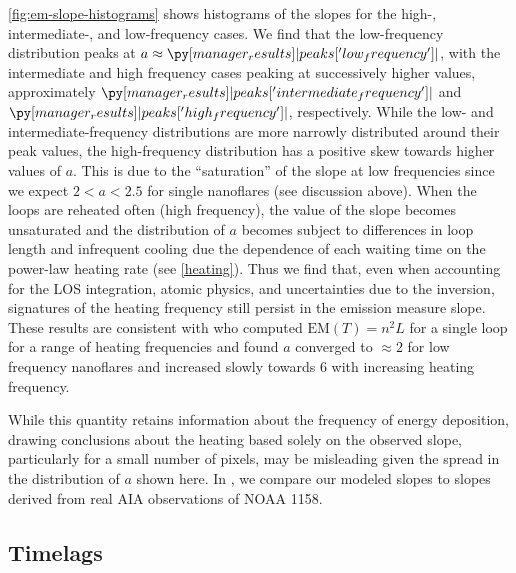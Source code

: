 \autoref{fig:em-slope-histograms} shows histograms of the \dem{} slopes for the high-, intermediate-, and low-frequency cases. We find that the low-frequency distribution peaks at $a\approx\py[manager_results]|peaks['low_frequency']|$, with the intermediate and high frequency cases peaking at successively higher values, approximately $\py[manager_results]|peaks['intermediate_frequency']|$ and $\py[manager_results]|peaks['high_frequency']|$, respectively. While the low- and intermediate-frequency distributions are more narrowly distributed around their peak values, the high-frequency distribution has a positive skew towards higher values of $a$. This is due to the ``saturation'' of the slope at low frequencies since we expect $2<a<2.5$ for single nanoflares (see discussion above). When the loops are reheated often (high frequency), the value of the slope becomes unsaturated and the distribution of $a$ becomes subject to differences in loop length and infrequent cooling due the dependence of each waiting time on the power-law heating rate (see \autoref{heating}). Thus we find that, even when accounting for the LOS integration, atomic physics, and uncertainties due to the \dem{} inversion, signatures of the heating frequency still persist in the emission measure slope. These results are consistent with \citet{cargill_active_2014} who computed $\mathrm{EM}(T)=n^2L$ for a single loop for a range of heating frequencies and found $a$ converged to $\approx2$ for low frequency nanoflares and increased slowly towards 6 with increasing heating frequency. 

While this quantity retains information about the frequency of energy deposition, drawing conclusions about the heating based solely on the observed \dem{} slope, particularly for a small number of pixels, may be misleading given the spread in the distribution of $a$ shown here. In , we compare our modeled \dem{} slopes to slopes derived from real AIA observations of NOAA 1158.

\subsection{Timelags}\label{timelags}

